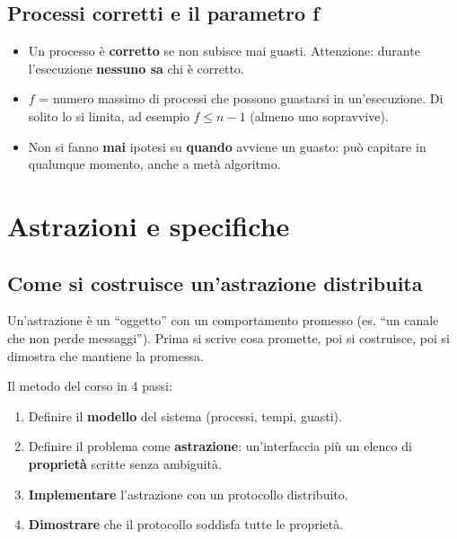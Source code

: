 \subsection{Processi corretti e il parametro f}

\begin{itemize}
\tightlist
\item
  Un processo è \textbf{corretto} se non subisce mai guasti. Attenzione: durante l'esecuzione \textbf{nessuno sa} chi è corretto.
\item
  \(f\) = numero massimo di processi che possono guastarsi in un'esecuzione. Di solito lo si limita, ad esempio \(f \le n-1\) (almeno uno sopravvive).
\item
  Non si fanno \textbf{mai} ipotesi su \textbf{quando} avviene un guasto: può capitare in qualunque momento, anche a metà algoritmo.
\end{itemize}

\section{Astrazioni e specifiche}

\subsection{Come si costruisce un'astrazione distribuita}

\begin{inbreve}

Un'astrazione è un ``oggetto'' con un comportamento promesso (es. ``un canale che non perde messaggi''). Prima si scrive cosa promette, poi si costruisce, poi si dimostra che mantiene la promessa.

\end{inbreve}

Il metodo del corso in 4 passi:

\begin{enumerate}
\def\labelenumi{\arabic{enumi}.}
\tightlist
\item
  Definire il \textbf{modello} del sistema (processi, tempi, guasti).
\item
  Definire il problema come \textbf{astrazione}: un'interfaccia più un elenco di \textbf{proprietà} scritte senza ambiguità.
\item
  \textbf{Implementare} l'astrazione con un protocollo distribuito.
\item
  \textbf{Dimostrare} che il protocollo soddisfa tutte le proprietà.
\end{enumerate}

